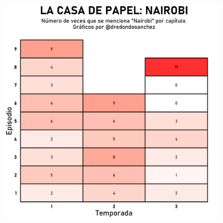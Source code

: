 \documentclass{beamer}
\begin{document}
\begin{frame}
\begin{columns}
\begin{column}{0.5\textwidth}
\begin{figure}
			\includegraphics[width=\textwidth]{images/16.png}
		\end{figure}
	\end{column}
	\end{columns}

\end{frame}
\end{document}
